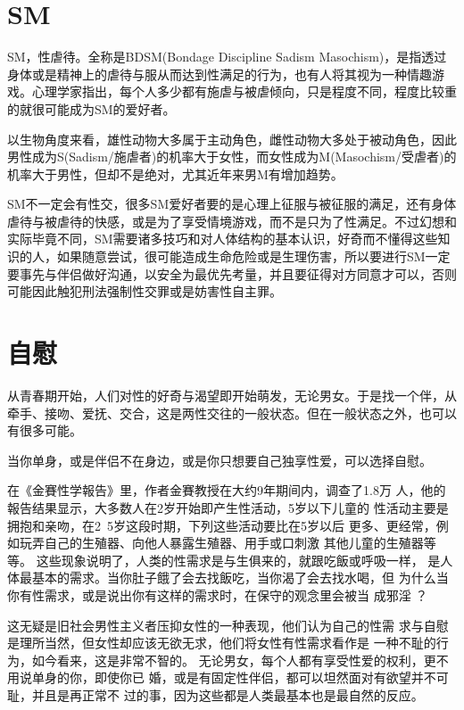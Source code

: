 \documentclass[12pt,UTF8]{ctexbook}
\begin{document}
\chapter{SM}

SM，性虐待。全称是BDSM(Bondage Discipline Sadism Masochism)，是指透过身体或是精神上的虐待与服从而达到性满足的行为，也有人将其视为一种情趣游戏。心理学家指出，每个人多少都有施虐与被虐倾向，只是程度不同，程度比较重的就很可能成为SM的爱好者。

以生物角度来看，雄性动物大多属于主动角色，雌性动物大多处于被动角色，因此男性成为S(Sadism/施虐者)的机率大于女性，而女性成为M(Masochism/受虐者)的机率大于男性，但却不是绝对，尤其近年来男M有增加趋势。

SM不一定会有性交，很多SM爱好者要的是心理上征服与被征服的满足，还有身体虐待与被虐待的快感，或是为了享受情境游戏，而不是只为了性满足。不过幻想和实际毕竟不同，SM需要诸多技巧和对人体结构的基本认识，好奇而不懂得这些知识的人，如果随意尝试，很可能造成生命危险或是生理伤害，所以要进行SM一定要事先与伴侣做好沟通，以安全为最优先考量，并且要征得对方同意才可以，否则可能因此触犯刑法强制性交罪或是妨害性自主罪。

\chapter{自慰}

从青春期开始，人们对性的好奇与渴望即开始萌发，无论男女。于是找一个伴，从牵手、接吻、爱抚、交合，这是两性交往的一般状态。但在一般状态之外，也可以有很多可能。

当你单身，或是伴侣不在身边，或是你只想要自己独享性爱，可以选择自慰。

在《金賽性学報告》里，作者金賽教授在大约9年期间内，调查了1.8万
人，他的報告结果显示，大多数人在2岁开始即产生性活动，5岁以下儿童的
性活动主要是拥抱和亲吻，在2~5岁这段时期，下列这些活动要比在5岁以后
更多、更经常，例如玩弄自己的生殖器、向他人暴露生殖器、用手或口刺激
其他儿童的生殖器等等。
这些现象说明了，人类的性需求是与生俱来的，就跟吃飯或呼吸一样，
是人体最基本的需求。当你肚子餓了会去找飯吃，当你渴了会去找水喝，但
为什么当你有性需求，或是说出你有这样的需求时，在保守的观念里会被当
成邪淫 ？

这无疑是旧社会男性主义者压抑女性的一种表现，他们认为自己的性需
求与自慰是理所当然，但女性却应该无欲无求，他们将女性有性需求看作是
一种不耻的行为，如今看来，这是非常不智的。
无论男女，每个人都有享受性爱的权利，更不用说单身的你，即使你已
婚，或是有固定性伴侣，都可以坦然面对有欲望并不可耻，并且是再正常不
过的事，因为这些都是人类最基本也是最自然的反应。
\end{document}
